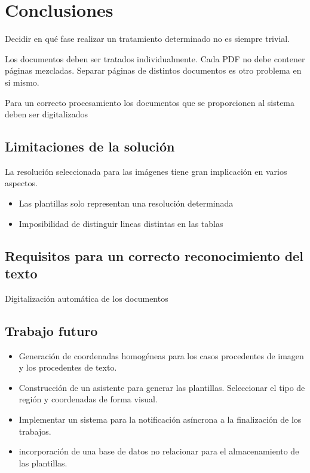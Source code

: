 
\chapter{Conclusiones}
\label{chap:conclusiones}

Decidir en qué fase realizar un tratamiento determinado no es siempre trivial.

Los documentos deben ser tratados individualmente. Cada PDF no debe contener páginas mezcladas. Separar páginas de distintos documentos es otro problema en si mismo.

Para un correcto procesamiento los documentos que se proporcionen al sistema deben ser digitalizados 

\section{Limitaciones de la solución}
La resolución seleccionada para las imágenes tiene gran implicación en varios aspectos.
\begin{itemize}
    \item Las plantillas solo representan una resolución determinada
    \item Imposibilidad de distinguir lineas distintas en las tablas
\end{itemize}

\section{Requisitos para un correcto reconocimiento del texto}
Digitalización automática de los documentos


\section{Trabajo futuro}

\begin{itemize}
    \item Generación de coordenadas homogéneas para los casos procedentes de imagen y los procedentes de texto.
    \item Construcción de un asistente para generar las plantillas. Seleccionar el tipo de región y coordenadas de forma visual.
    \item Implementar un sistema para la notificación asíncrona a la finalización de los trabajos.
    \item incorporación de una base de datos no relacionar para el almacenamiento de las plantillas.
\end{itemize}

